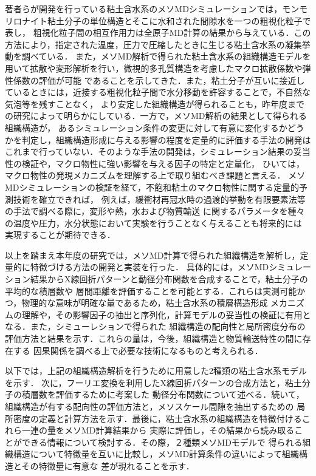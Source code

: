 著者らが開発を行っている粘土含水系のメソMDシミュレーションでは，モンモリロナイト粘土分子の単位構造とそこに水和された間隙水を一つの粗視化粒子で表し，
粗視化粒子間の相互作用力は全原子MD計算の結果から与えている．この方法により，指定された温度，圧力で圧縮したときに生じる粘土含水系の凝集挙動を調べている．
また，メソMD解析で得られた粘土含水系の組織構造モデルを用いて拡散や変形解析を行い，微視的多孔質構造を考慮したマクロ拡散係数や弾性係数の評価が可能
であることを示してきた．また，粘土分子が互いに接近しているときには，近接する粗視化粒子間で水分移動を許容することで，不自然な気泡等を残すことなく，
より安定した組織構造が得られることも，昨年度までの研究によって明らかにしている．一方で，メソMD解析の結果として得られる組織構造が，
あるシミュレーション条件の変更に対して有意に変化するかどうかを判定し，組織構造形成に与える影響の程度を定量的に評価する手法の開発は
これまで行っていない．そのような手法の開発は，シミュレーション結果の妥当性の検証や，マクロ物性に強い影響を与える因子の特定と定量化，
ひいては，マクロ物性の発現メカニズムを理解する上で取り組むべき課題と言える．
%
メソMDシミュレーションの検証を経て，不飽和粘土のマクロ物性に関する定量的予測技術を確立できれば，
例えば，緩衝材再冠水時の過渡的挙動を有限要素法等の手法で調べる際に，変形や熱，水および物質輸送
に関するパラメータを種々の温度や圧力，水分状態において実験を行うことなく与えることも将来的には
実現することが期待できる．
%

以上を踏まえ本年度の研究では，メソMD計算で得られた組織構造を解析し，定量的に特徴づける方法の開発と実装を行った．
具体的には，メソMDシミュレーション結果からX線回折パターンと動径分布関数を合成することで，粘土分子の平均的な積層数や
層間距離を評価することを可能とする．これらは実測可能かつ，物理的な意味が明確な量であるため，粘土含水系の積層構造形成
メカニズムの理解や，その影響因子の抽出と序列化，計算モデルの妥当性の検証に有用となる．また，シミューレションで得られた
組織構造の配向性と局所密度分布の評価方法と結果を示す．これらの量は，今後，組織構造と物質輸送特性の間に存在する
因果関係を調べる上で必要な技術になるものと考えられる．

以下では，上記の組織構造解析を行うために用意した2種類の粘土含水系モデルを示す．
次に，フーリエ変換を利用したX線回折パターンの合成方法と，粘土分子の積層数を評価するために考案した
動径分布関数について述べる．続いて，組織構造が有する配向性の評価方法と，メソスケール間隙を抽出するための
局所密度の定義と計算方法を示す．最後に，粘土含水系の組織構造を特徴付けるこれら一連の量をメソMD計算結果から
実際に評価し，その結果から読み取ることができる情報について検討する．その際，２種類メソMDモデルで
得られる組織構造について特徴量を互いに比較し，メソMD計算条件の違いによって組織構造とその特徴量に有意な
差が現れることを示す．

